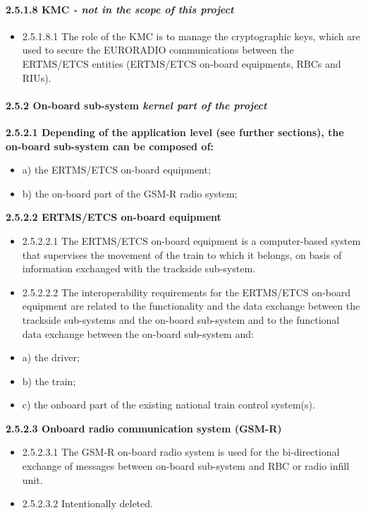 \paragraph{2.5.1.8 KMC \textit{- not in the scope of this project}}
\begin{itemize}
\item 2.5.1.8.1	The role of the KMC is to manage the cryptographic keys, which are used to secure the EURORADIO communications between the ERTMS/ETCS entities (ERTMS/ETCS on-board equipments, RBCs and RIUs).
\end{itemize}

\paragraph{2.5.2 On-board sub-system \textit{kernel part of the project}}

\textbf{2.5.2.1	Depending of the application level (see further sections), the on-board sub-system can be composed of:}
\begin{itemize}
\item a)	the ERTMS/ETCS on-board equipment;
\item b)	the on-board part of the GSM-R  radio system;
\end{itemize}


\textbf{2.5.2.2	ERTMS/ETCS on-board equipment}
\begin{itemize}
\item 2.5.2.2.1	The ERTMS/ETCS on-board equipment is a computer-based system that supervises the movement of the train to which it belongs, on basis of information exchanged with the trackside sub-system. 
\item 2.5.2.2.2	The interoperability requirements for the ERTMS/ETCS on-board equipment are related to the functionality and the data exchange between the trackside sub-systems and the on-board sub-system and to the functional data exchange between the on-board sub-system and:
\item a) the driver;
\item b) the train;
\item c) the onboard part of the existing national train control system(s).
\end{itemize}

\textbf{2.5.2.3	Onboard radio communication system (GSM-R)}
\begin{itemize}
\item 2.5.2.3.1	The GSM-R on-board radio system is used for the bi-directional exchange of messages between on-board sub-system and RBC or radio infill unit. 
\item 2.5.2.3.2	Intentionally deleted.
\end{itemize}

